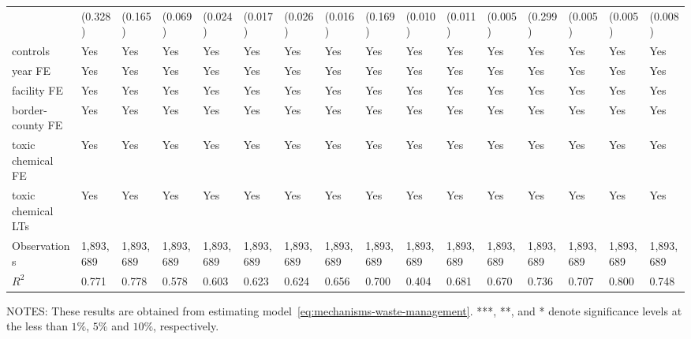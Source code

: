 \begin{table}[H]
{\begin{tabular}{@{}llllllllllllllll@{}}
            & (0.328)   & (0.165)   & (0.069)   & (0.024)    & (0.017)   & (0.026)   & (0.016)   & (0.169)         & (0.010)   & (0.011)  & (0.005)  & (0.299)  & (0.005)  & (0.005)       & (0.008)         \\
            controls           & Yes       & Yes       & Yes       & Yes        & Yes       & Yes       & Yes       & Yes             & Yes       & Yes       & Yes       & Yes       & Yes       & Yes            & Yes              \\
            year FE            & Yes       & Yes       & Yes       & Yes        & Yes       & Yes       & Yes       & Yes             & Yes       & Yes       & Yes       & Yes       & Yes       & Yes            & Yes              \\
            facility FE        & Yes       & Yes       & Yes       & Yes        & Yes       & Yes       & Yes       & Yes             & Yes       & Yes       & Yes       & Yes       & Yes       & Yes            & Yes              \\
            border-county FE   & Yes       & Yes       & Yes       & Yes        & Yes       & Yes       & Yes       & Yes             & Yes       & Yes       & Yes       & Yes       & Yes       & Yes            & Yes              \\
            toxic chemical FE  & Yes       & Yes       & Yes       & Yes        & Yes       & Yes       & Yes       & Yes             & Yes       & Yes       & Yes       & Yes       & Yes       & Yes            & Yes              \\
            toxic chemical LTs & Yes       & Yes       & Yes       & Yes        & Yes       & Yes       & Yes       & Yes             & Yes       & Yes       & Yes       & Yes       & Yes       & Yes            & Yes              \\ \midrule
            Observations       & 1,893,689 & 1,893,689 & 1,893,689 & 1,893,689  & 1,893,689 & 1,893,689 & 1,893,689 & 1,893,689       & 1,893,689 & 1,893,689 & 1,893,689 & 1,893,689 & 1,893,689 & 1,893,689      & 1,893,689        \\
            $R^2$              & 0.771     & 0.778     & 0.578     & 0.603      & 0.623     & 0.624     & 0.656     & 0.700           & 0.404     & 0.681     & 0.670     & 0.736     & 0.707    & 0.800         & 0.748           \\ \bottomrule \bottomrule
        \end{tabular}%
    }
    \begin{minipage}{14cm}
        \vspace{0.05in}
        NOTES: These results are obtained from estimating model~\ref{eq:mechanisms-waste-management}. ***, **, and * denote significance levels at the less than $1\%$, $5\%$ and $10\%$, respectively.
    \end{minipage}
\end{table}